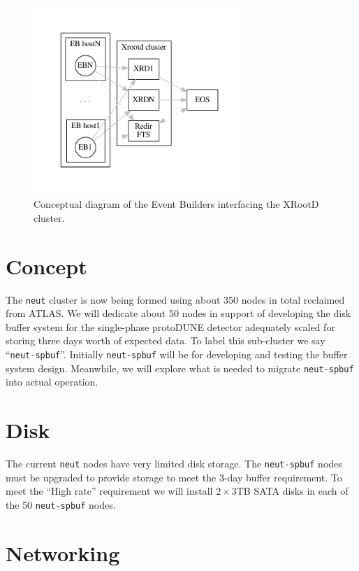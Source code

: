 \documentclass[pdftex,12pt,letter]{article}
\begin{document}
\begin{figure}[tbh]
  \centering
  \includegraphics[width=0.7\textwidth]{figures/doob-join.pdf}
  \caption{Conceptual diagram of the Event Builders interfacing the XRootD cluster.}
  \label{fig:doob-join}
\end{figure}

\section{Concept}

The \texttt{neut} cluster is now being formed using about 350 nodes in
total reclaimed from ATLAS.  We will dedicate about 50 nodes in
support of developing the disk buffer system for the single-phase
protoDUNE detector adequately scaled for storing three days worth of
expected data.  To label this sub-cluster we say
``\texttt{neut-spbuf}''.  Initially \texttt{neut-spbuf} will be for
developing and testing the buffer system design.  Meanwhile, we will
explore what is needed to migrate \texttt{neut-spbuf} into actual
operation.

\section{Disk}

The current \texttt{neut} nodes have very limited disk storage.  The
\texttt{neut-spbuf} nodes must be upgraded to provide storage to meet
the 3-day buffer requirement. To meet the ``High rate'' requirement we
will install $2\times 3$TB SATA disks in each of the 50
\texttt{neut-spbuf} nodes.

\section{Networking}
\end{document}
